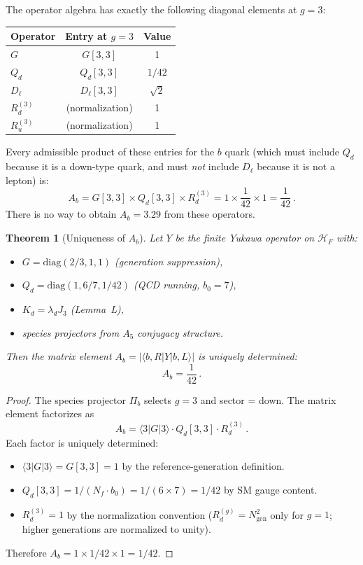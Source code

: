 \documentclass[11pt,a4paper]{article}
\newtheorem{theorem}{Theorem}
\theoremstyle{definition}
\theoremstyle{remark}
\begin{document}
The operator algebra has exactly the following diagonal elements at $g = 3$:
\begin{center}
\begin{tabular}{lcc}
\toprule
Operator & Entry at $g = 3$ & Value \\
\midrule
$G$ & $G[3,3]$ & 1 \\
$Q_d$ & $Q_d[3,3]$ & $1/42$ \\
$D_\ell$ & $D_\ell[3,3]$ & $\sqrt{2}$ \\
$R_d^{(3)}$ & (normalization) & 1 \\
$R_u^{(3)}$ & (normalization) & 1 \\
\bottomrule
\end{tabular}
\end{center}

Every admissible product of these entries for the $b$ quark (which must
include $Q_d$ because it is a down-type quark, and must \emph{not} include
$D_\ell$ because it is not a lepton) is:
\begin{equation}
A_b = G[3,3] \times Q_d[3,3] \times R_d^{(3)} = 1 \times \frac{1}{42} \times 1
    = \frac{1}{42}\,.
\end{equation}
There is no way to obtain $A_b = 3.29$ from these operators.

\begin{theorem}[Uniqueness of $A_b$]
\label{thm:Ab_unique}
Let $Y$ be the finite Yukawa operator on $\mathcal{H}_F$ with:
\begin{itemize}
\item[(i)]   $G = \mathrm{diag}(2/3, 1, 1)$ (generation suppression),
\item[(ii)]  $Q_d = \mathrm{diag}(1, 6/7, 1/42)$ (QCD running, $b_0 = 7$),
\item[(iii)] $K_d = \lambda_d J_3$ (Lemma~L),
\item[(iv)]  species projectors from $A_5$ conjugacy structure.
\end{itemize}
Then the matrix element $A_b = |\langle b,R| Y |b,L\rangle|$ is uniquely
determined:
\begin{equation}
A_b = \frac{1}{42}\,.
\end{equation}
\end{theorem}

\begin{proof}
The species projector $\Pi_b$ selects $g = 3$ and sector = down.
The matrix element factorizes as
\[
A_b = \langle 3| G |3\rangle \cdot Q_d[3,3] \cdot R_d^{(3)}\,.
\]
Each factor is uniquely determined:
\begin{itemize}
\item $\langle 3|G|3\rangle = G[3,3] = 1$ by the reference-generation definition.
\item $Q_d[3,3] = 1/(N_f \cdot b_0) = 1/(6 \times 7) = 1/42$ by SM gauge content.
\item $R_d^{(3)} = 1$ by the normalization convention ($R_d^{(g)} = N_{\text{gen}}^2$
      only for $g = 1$; higher generations are normalized to unity).
\end{itemize}
Therefore $A_b = 1 \times 1/42 \times 1 = 1/42$.
\end{proof}
\end{document}

